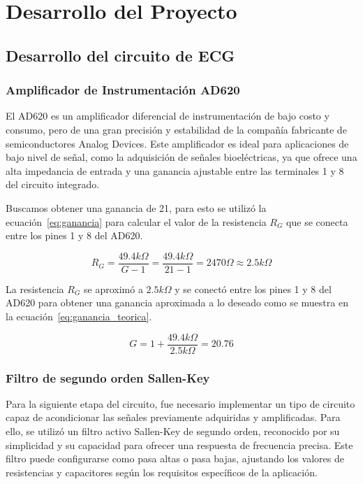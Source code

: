\newpage
\section{Desarrollo del Proyecto}
    \subsection{Desarrollo del circuito de ECG}
        \subsubsection{Amplificador de Instrumentación AD620}
            El AD620 es un amplificador diferencial de instrumentación de bajo costo y consumo, pero de una gran precisión y estabilidad de la compañía fabricante de semiconductores Analog Devices. Este amplificador es ideal para aplicaciones de bajo nivel de señal, como la adquisición de señales bioeléctricas, ya que ofrece una alta impedancia de entrada y una ganancia ajustable entre las terminales 1 y 8 del circuito integrado.

            Buscamos obtener una ganancia de 21, para esto se utilizó la ecuación~\ref{eq:ganancia} para calcular el valor de la resistencia $R_G$ que se conecta entre los pines 1 y 8 del AD620.

            \begin{equation}
                \label{eq:resistencia}
                R_G = \frac{49.4 k\Omega}{G - 1} = \frac{49.4 k\Omega}{21 - 1} = 2470 \Omega \approx 2.5 k\Omega
            \end{equation}

            La resistencia $R_G$ se aproximó a $2.5 k\Omega$ y se conectó entre los pines 1 y 8 del AD620 para obtener una ganancia aproximada a lo deseado como se muestra en la ecuación~\ref{eq:ganancia_teorica}.

            \begin{equation}
                \label{eq:ganancia_teorica}
                G = 1 + \frac{49.4 k\Omega}{2.5 k\Omega} = 20.76
            \end{equation}

        \subsubsection{Filtro de segundo orden Sallen-Key}
            Para la siguiente etapa del circuito, fue necesario implementar un tipo de circuito capaz de acondicionar las señales previamente adquiridas y amplificadas. Para ello, se utilizó un filtro activo Sallen-Key de segundo orden, reconocido por su simplicidad y su capacidad para ofrecer una respuesta de frecuencia precisa. Este filtro puede configurarse como pasa altas o pasa bajas, ajustando los valores de resistencias y capacitores según los requisitos específicos de la aplicación.

